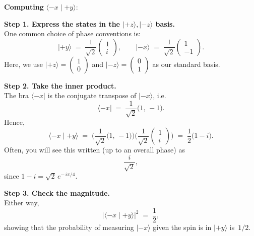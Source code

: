 \documentclass[12pt]{article}
\theoremstyle{definition} %
\theoremstyle{plain} %
\begin{document}
\noindent
\textbf{Computing } $\langle -x \mid +y \rangle$:

\bigskip
\noindent
\textbf{Step 1. Express the states in the $\lvert +z\rangle,\lvert -z\rangle$ basis.}\\
One common choice of phase conventions is:
\[
\lvert +y\rangle 
  \;=\; \frac{1}{\sqrt{2}} 
  \begin{pmatrix}
  1 \\[5pt]
  i
  \end{pmatrix},
\qquad
\lvert -x\rangle 
  \;=\; \frac{1}{\sqrt{2}}
  \begin{pmatrix}
  1 \\[5pt]
  -1
  \end{pmatrix}.
\]
Here, we use 
$\lvert +z\rangle = \begin{pmatrix} 1 \\ 0 \end{pmatrix}$ and 
$\lvert -z\rangle = \begin{pmatrix} 0 \\ 1 \end{pmatrix}$ 
as our standard basis.

\bigskip
\noindent
\textbf{Step 2. Take the inner product.}\\
The bra $\langle -x\vert$ is the conjugate transpose of $\lvert -x\rangle$, i.e.
\[
\langle -x\vert 
  \;=\; \frac{1}{\sqrt{2}} 
  \bigl(1,\,-1\bigr).
\]
Hence,
\[
\langle -x \mid +y \rangle
  \;=\; 
  \biggl(\frac{1}{\sqrt{2}} \bigl(1,\,-1\bigr)\biggr)
  \biggl(\frac{1}{\sqrt{2}}\begin{pmatrix}1\\[4pt] i\end{pmatrix}\biggr)
  \;=\;
  \frac{1}{2} \bigl(1 - i\bigr).
\]
Often, you will see this written (up to an overall phase) as 
\[
\frac{i}{\sqrt{2}},
\]
since $1 - i = \sqrt{2}\, e^{-\,i\pi/4}$.

\bigskip
\noindent
\textbf{Step 3. Check the magnitude.}\\
Either way,
\[
\bigl|\langle -x \mid +y \rangle \bigr|^2
  \;=\; \frac12,
\]
showing that the probability of measuring $\lvert -x\rangle$ given the spin is in $\lvert +y\rangle$ is~$1/2$.
\end{document}
